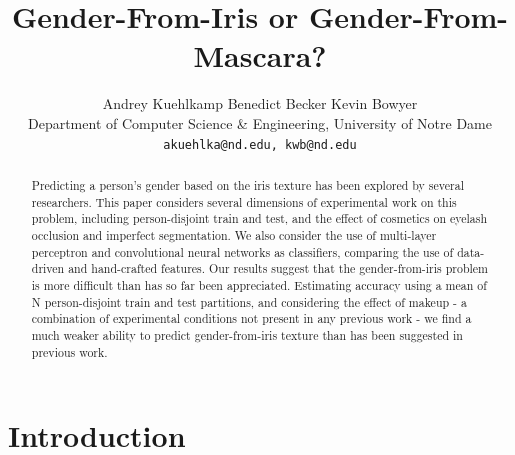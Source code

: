 \documentclass[10pt,twocolumn,letterpaper]{article}
\begin{document}
\title{Gender-From-Iris or Gender-From-Mascara? }

\author{Andrey Kuehlkamp \hspace{1cm} Benedict Becker \hspace{1cm} Kevin Bowyer \\
Department of Computer Science \& Engineering, University of Notre Dame\\
{\tt\small akuehlka@nd.edu, kwb@nd.edu}
}

\maketitle
\ifwacvfinal\thispagestyle{empty}\fi

\begin{abstract}
Predicting a person's gender based on the iris texture has been explored by several researchers.
This paper considers several dimensions of experimental work on this problem, including person-disjoint train and test, and the effect of cosmetics on eyelash occlusion and imperfect segmentation.
We also consider the use of multi-layer perceptron and convolutional neural networks as classifiers, comparing the use of data-driven and hand-crafted features.
Our results suggest that the gender-from-iris problem is more difficult than has so far been appreciated.
Estimating accuracy using a mean of N person-disjoint train and test partitions, and considering the effect of makeup - a combination of experimental conditions not present in any previous work - we find a much weaker ability to predict gender-from-iris texture than has been suggested in previous work.
\end{abstract}

\section{Introduction}
\end{document}
